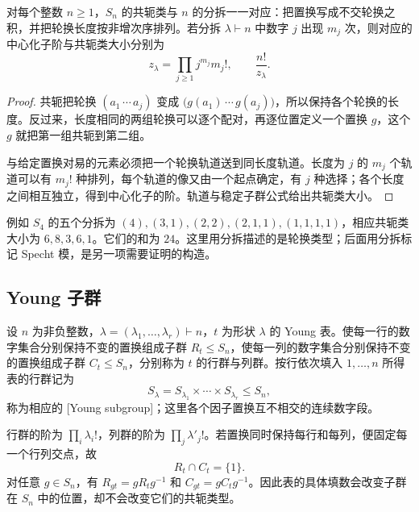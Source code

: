 \begin{proposition}\label{b5:prop:symmetric-conjugacy-partitions}
	对每个整数 \(n\geq1\)，\(S_n\) 的共轭类与 \(n\) 的分拆一一对应：把置换写成不交轮换之积，并把轮换长度按非增次序排列。若分拆 \(\lambda\vdash n\) 中数字 \(j\) 出现 \(m_j\) 次，则对应的中心化子阶与共轭类大小分别为
	\[
		z_\lambda=\prod_{j\geq1}j^{m_j}m_j!, \qquad \frac{n!}{z_\lambda}.
	\]
\end{proposition}
\begin{proof}
	共轭把轮换 \((a_1\,\cdots\,a_j)\) 变成 \(\bigl(g(a_1)\,\cdots\,g(a_j)\bigr)\)，所以保持各个轮换的长度。反过来，长度相同的两组轮换可以逐个配对，再逐位置定义一个置换 \(g\)，这个 \(g\) 就把第一组共轭到第二组。

	与给定置换对易的元素必须把一个轮换轨道送到同长度轨道。长度为 \(j\) 的 \(m_j\) 个轨道可以有 \(m_j!\) 种排列，每个轨道的像又由一个起点确定，有 \(j\) 种选择；各个长度之间相互独立，得到中心化子的阶。轨道与稳定子群公式给出共轭类大小。
\end{proof}

例如 \(S_4\) 的五个分拆为 \((4),(3,1),(2,2),(2,1,1),(1,1,1,1)\)，相应共轭类大小为 \(6,8,3,6,1\)。它们的和为 \(24\)。这里用分拆描述的是轮换类型；后面用分拆标记 Specht 模，是另一项需要证明的构造。

\subsection{Young 子群}
\label{b5:subsec:0601:03}

\begin{definition}\label{b5:def:row-column-groups}
	设 \(n\) 为非负整数，\(\lambda=(\lambda_1,\ldots,\lambda_r)\vdash n\)，\(t\) 为形状 \(\lambda\) 的 Young 表。使每一行的数字集合分别保持不变的置换组成子群 \(R_t\leq S_n\)，使每一列的数字集合分别保持不变的置换组成子群 \(C_t\leq S_n\)，分别称为 \(t\) 的行群与列群。按行依次填入 \(1,\ldots,n\) 所得表的行群记为
	\[
		S_\lambda=S_{\lambda_1}\times\cdots\times S_{\lambda_r}\leq S_n,
	\]
	称为相应的 [Young subgroup]；这里各个因子置换互不相交的连续数字段。
\end{definition}

行群的阶为 \(\prod_i\lambda_i!\)，列群的阶为 \(\prod_j\lambda'_j!\)。若置换同时保持每行和每列，便固定每一个行列交点，故
\begin{equation}\label{b5:eq:row-column-intersection}
	R_t\cap C_t=\{1\}.
\end{equation}
对任意 \(g\in S_n\)，有 \(R_{gt}=gR_tg^{-1}\) 和 \(C_{gt}=gC_tg^{-1}\)。因此表的具体填数会改变子群在 \(S_n\) 中的位置，却不会改变它们的共轭类型。
